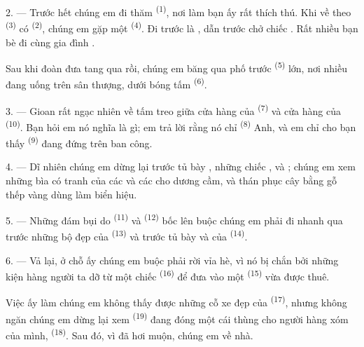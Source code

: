 2. --- Trước hết chúng em đi thăm  \textsuperscript{(1)}, nơi làm
bạn ấy rất thích thú. Khi về theo  \textsuperscript{(3)} có  \textsuperscript{(2)}, chúng em gặp một 
\textsuperscript{(4)}. Đi trước  là , dẫn
trước  chở chiếc . Rất nhiều bạn bè đi cùng gia đình
.

Sau khi đoàn đưa tang qua rồi, chúng em băng qua phố trước 
\textsuperscript{(5)} lớn, nơi nhiều  đang uống  trên sân
thượng, dưới bóng tấm  \textsuperscript{(6)}.

3. --- Gioan rất ngạc nhiên về tấm  treo giữa cửa hàng của  \textsuperscript{(7)} và cửa hàng của 
\textsuperscript{(10)}. Bạn hỏi em nó nghĩa là gì; em trả lời rằng nó chỉ  \textsuperscript{(8)} Anh, và em chỉ cho bạn thấy 
\textsuperscript{(9)} đang đứng trên ban công.

\VUsaut{3.0mm}

4. --- Dĩ nhiên chúng em dừng lại trước tủ bày , những chiếc ,  và ; chúng em xem những bìa có
tranh của các  và các  cho dương cầm, và thán phục cây
 bằng gỗ thếp vàng dùng làm biển hiệu.

5. --- Những đám bụi do  \textsuperscript{(11)} và  \textsuperscript{(12)} bốc lên buộc chúng em phải đi nhanh qua trước những
bộ  đẹp của  \textsuperscript{(13)} và trước tủ
bày  và  của  \textsuperscript{(14)}.

6. --- Vả lại, ở chỗ ấy chúng em buộc phải rời vỉa hè, vì nó bị chắn bởi những kiện hàng
người ta dỡ từ một chiếc  \textsuperscript{(16)} để đưa vào một
 \textsuperscript{(15)} vừa được thuê.

Việc ấy làm chúng em không thấy được những cỗ xe đẹp của 
\textsuperscript{(17)}, nhưng không ngăn chúng em dừng lại xem 
\textsuperscript{(19)} đang đóng một cái thùng cho người hàng xóm của mình,
 \textsuperscript{(18)}. Sau đó, vì đã hơi muộn, chúng
em về nhà.

